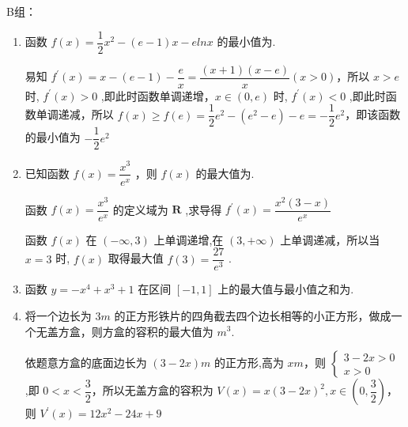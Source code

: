 B组：
\begin{enumerate}
    \item 函数 $f\left( x\right)  = \dfrac{1}{2}{x}^{2} - \left( {{e} - 1}\right) x - {{eln}}x$ 的最小值为.
    \begin{jieda}
        易知 ${f}^{\prime }\left( x\right)  = x - \left( {{e} - 1}\right)  - \dfrac{{e}}{x} = \dfrac{\left( {x + 1}\right) \left( {x - {e}}\right) }{x}\left( {x > 0}\right)$，所以 $x > {e}$ 时, ${f}^{\prime }\left( x\right)  > 0$ ,即此时函数单调递增，$x \in  \left( {0,{e}}\right)$ 时, ${f}^{\prime }\left( x\right)  < 0$ ,即此时函数单调递减，所以 $f\left( x\right)  \geq  f\left( {e}\right)  = \dfrac{1}{2}{{e}}^{2} - \left( {{{e}}^{2} - {e}}\right)  - {e} =  - \dfrac{1}{2}{{e}}^{2}$，即该函数的最小值为 $- \dfrac{1}{2}{{e}}^{2}$
    \end{jieda}

    \item 已知函数 $f\left( x\right)  = \dfrac{{x}^{3}}{{{e}}^{x}}$ ，则 $f\left( x\right)$ 的最大值为.
    \begin{jieda}
        函数 $f\left( x\right)  = \dfrac{{x}^{3}}{{{e}}^{x}}$ 的定义域为 $\mathbf{R}$ ,求导得 ${f}^{\prime }\left( x\right)  = \dfrac{{x}^{2}\left( {3 - x}\right) }{{{e}}^{x}}$
        
        函数 $f\left( x\right)$ 在 $\left( {-\infty ,3}\right)$ 上单调递增,在 $\left( {3, + \infty }\right)$ 上单调递减，所以当 $x = 3$ 时, $f\left( x\right)$ 取得最大值 $f\left( 3\right)  = \dfrac{27}{{{e}}^{3}}$ .
    \end{jieda}

    \item 函数 $y =  - {x}^{4} + {x}^{3} + 1$ 在区间 $\left\lbrack  {-1,1}\right\rbrack$ 上的最大值与最小值之和为.

    \item 将一个边长为 $3{m}$ 的正方形铁片的四角截去四个边长相等的小正方形，做成一个无盖方盒，则方盒的容积的最大值为 ${{m}}^{3}$.
    \begin{jieda}
        依题意方盒的底面边长为 $\left( {3 - {2x}}\right) {m}$ 的正方形,高为 $x{m}$，则 $\left\{  \begin{array}{l} 3 - {2x} > 0 \\  x > 0 \end{array}\right.$ ,即 $0 < x < \dfrac{3}{2}$，所以无盖方盒的容积为 $V\left( x\right)  = x{\left(3 - 2x\right) }^{2},x \in  \left( {0,\dfrac{3}{2}}\right)$，则 ${V}^{\prime }\left( x\right)  = {12}{x}^{2} - {24x} + 9$ 
        

\end{jieda}
\end{enumerate}
